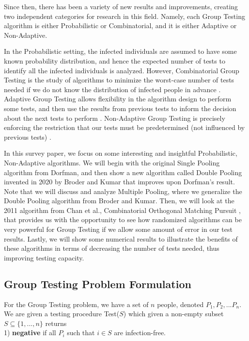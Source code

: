 \documentclass[12pt]{article}
\begin{document}
Since then, there has been a variety of new results and improvements, creating two independent categories for research in this field. Namely, each Group Testing algorithm is either Probabilistic or Combinatorial, and it is either Adaptive or Non-Adaptive.

In the Probabilistic setting, the infected individuals are assumed to have some known probability distribution, and hence the expected number of tests to identify all the infected individuals is analyzed. However, Combinatorial Group Testing is the study of algorithms to  minimize the worst-case number of tests needed if we do not know the distribution of infected people in advance \cite{combinatorial}. Adaptive Group Testing allows flexibility in the algorithm design to perform some tests, and then use the results from previous tests to inform the decision about the next tests to perform \cite{adaptive}. Non-Adaptive Group Testing is precisely enforcing the restriction that our tests must be predetermined (not influenced by previous tests) \cite{wiki}.

In this survey paper, we focus on some interesting and insightful Probabilistic, Non-Adaptive algorithms. We will begin with the original Single Pooling algorithm from Dorfman, and then show a new algorithm called Double Pooling invented in 2020 by Broder and Kumar \cite{BK2020} that improves upon Dorfman's result. Note that we will discuss and analyze Multiple Pooling, where we generalize the Double Pooling algorithm from Broder and Kumar. Then, we will look at the 2011 algorithm from Chan et al., Combinatorial Orthogonal Matching Pursuit \cite{chan}, that provides us with the opportunity to see how randomized algorithms can be very powerful for Group Testing if we allow some amount of error in our test results. Lastly, we will show some numerical results to illustrate the benefits of these algorithms in terms of decreasing the number of tests needed, thus improving testing capacity.


\subsection{Group Testing Problem Formulation}
For the Group Testing problem, we have a set of $n$ people, denoted ${P_1, P_2, ... P_n}$. 
We are given a testing procedure {\sf Test($S$)} which given a non-empty subset $S \subseteq \{1,...,n\}$ returns \\

1) \textbf{negative} if all $P_i$ such that $i \in S$ are infection-free. \\
\end{document}
